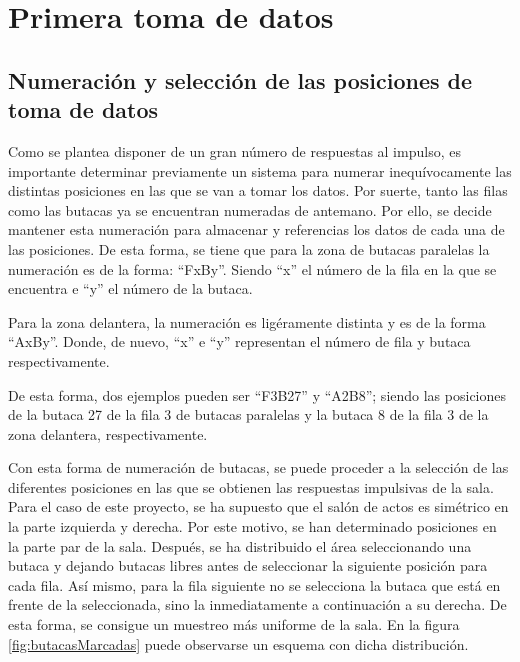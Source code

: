 \documentclass[11pt,a4paper,twoside]{book}
\begin{document}
    \section{Primera toma de datos}
	    \subsection{Numeración y selección de las posiciones de toma de datos}
		    Como se plantea disponer de un gran número de respuestas al impulso, es importante determinar previamente un sistema para numerar inequívocamente las distintas posiciones en las que se van a tomar los datos. Por suerte, tanto las filas como las butacas ya se encuentran numeradas de antemano. Por ello, se decide mantener esta numeración para almacenar y referencias los datos de cada una de las posiciones. De esta forma, se tiene que para la zona de butacas paralelas la numeración es de la forma: ``FxBy''. Siendo ``x'' el número de la fila en la que se encuentra e ``y'' el número de la butaca.

		    Para la zona delantera, la numeración es ligéramente distinta y es de la forma ``AxBy''. Donde, de nuevo, ``x'' e ``y'' representan el número de fila y butaca respectivamente.

		    De esta forma, dos ejemplos pueden ser ``F3B27'' y ``A2B8''; siendo las posiciones de la butaca 27 de la fila 3 de butacas paralelas y la butaca 8 de la fila 3 de la zona delantera, respectivamente.

		    Con esta forma de numeración de butacas, se puede proceder a la selección de las diferentes posiciones en las que se obtienen las respuestas impulsivas de la sala. Para el caso de este proyecto, se ha supuesto que el salón de actos es simétrico en la parte izquierda y derecha. Por este motivo, se han determinado posiciones en la parte par de la sala. Después, se ha distribuido el área seleccionando una butaca y dejando butacas libres antes de seleccionar la siguiente posición para cada fila. Así mismo, para la fila siguiente no se selecciona la butaca que está en frente de la seleccionada, sino la inmediatamente a continuación a su derecha. De esta forma, se consigue un muestreo más uniforme de la sala. En la figura \ref{fig:butacasMarcadas} puede observarse un esquema con dicha distribución. 
		
\end{document}
